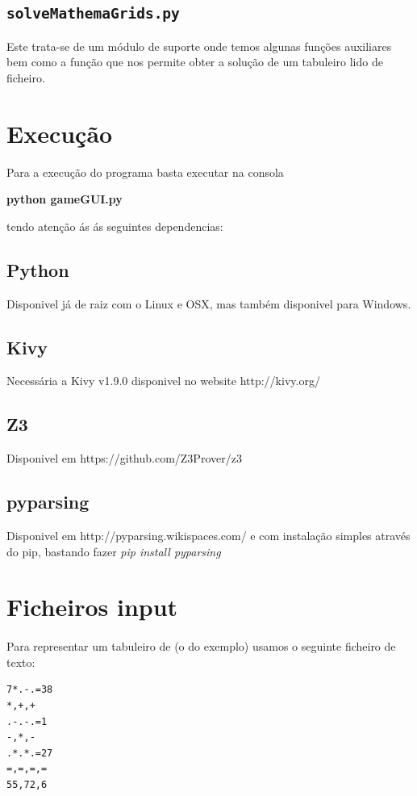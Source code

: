 \documentclass{article}
\begin{document}
\subsection{\texttt{solveMathemaGrids.py}}
Este trata-se de um módulo de suporte onde temos algunas funções auxiliares bem como a função que nos permite obter a solução de um tabuleiro lido de ficheiro.
\newpage
\section{Execução}
Para a execução do programa basta executar na consola 
\begin{center}
\textbf{python gameGUI.py}
\end{center}
tendo atenção ás ás seguintes dependencias:
\subsection{Python}
Disponivel já de raiz com o Linux e OSX, mas também disponivel para Windows.
\subsection{Kivy}
Necessária a Kivy v1.9.0 disponivel no website http://kivy.org/
\subsection{Z3}
Disponivel em https://github.com/Z3Prover/z3
\subsection{pyparsing}
Disponivel em http://pyparsing.wikispaces.com/ e com instalação simples através do pip, bastando fazer \it{pip install pyparsing}
\newpage

\section{Ficheiros input}

\paragraph{} 

Para representar um tabuleiro de {} (o do exemplo) usamos o seguinte ficheiro de texto:
\begin{center}
\begin{verbatim}
7*.-.=38
*,+,+
.-.-.=1
-,*,-
.*.*.=27
=,=,=,=
55,72,6
\end{verbatim}
\end{center}
\end{document}
